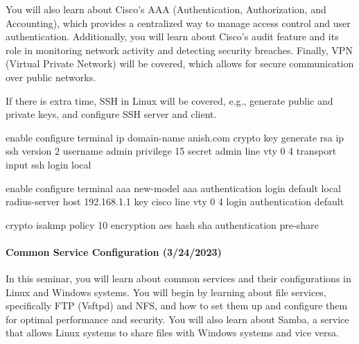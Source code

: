 \documentclass[
  letterpaper,
  DIV=11,
  numbers=noendperiod]{scrartcl}
\let\oldparagraph\paragraph
\renewcommand{\paragraph}[1]{\oldparagraph{#1}\mbox{}}
\newenvironment{Shaded}{\begin{snugshade}}{\end{snugshade}}
\newcommand{\NormalTok}[1]{\textcolor[rgb]{0.00,0.23,0.31}{#1}}
\begin{document}
You will also learn about Cisco's AAA (Authentication, Authorization,
and Accounting), which provides a centralized way to manage access
control and user authentication. Additionally, you will learn about
Cisco's audit feature and its role in monitoring network activity and
detecting security breaches. Finally, VPN (Virtual Private Network) will
be covered, which allows for secure communication over public networks.

If there is extra time, SSH in Linux will be covered, e.g., generate
public and private keys, and configure SSH server and client.

\begin{Shaded}
\begin{Highlighting}[]
\NormalTok{enable}
\NormalTok{configure terminal}
\NormalTok{ip domain{-}name anish.com}
\NormalTok{crypto key generate rsa}
\NormalTok{ip ssh version 2}
\NormalTok{username admin privilege 15 secret admin}
\NormalTok{line vty 0 4}
\NormalTok{transport input ssh}
\NormalTok{login local}
\end{Highlighting}
\end{Shaded}

\begin{Shaded}
\begin{Highlighting}[]
\NormalTok{enable}
\NormalTok{configure terminal}
\NormalTok{aaa new{-}model}
\NormalTok{aaa authentication login default local}
\NormalTok{radius{-}server host 192.168.1.1 key cisco}
\NormalTok{line vty 0 4}
\NormalTok{login authentication default}
\end{Highlighting}
\end{Shaded}

\begin{Shaded}
\begin{Highlighting}[]
\NormalTok{crypto isakmp policy 10}
\NormalTok{encryption aes}
\NormalTok{hash sha}
\NormalTok{authentication pre{-}share}
\end{Highlighting}
\end{Shaded}

\hypertarget{common-service-configuration-3242023}{%
\paragraph{Common Service Configuration
(3/24/2023)}\label{common-service-configuration-3242023}}

In this seminar, you will learn about common services and their
configurations in Linux and Windows systems. You will begin by learning
about file services, specifically FTP (Vsftpd) and NFS, and how to set
them up and configure them for optimal performance and security. You
will also learn about Samba, a service that allows Linux systems to
share files with Windows systems and vice versa.
\end{document}
